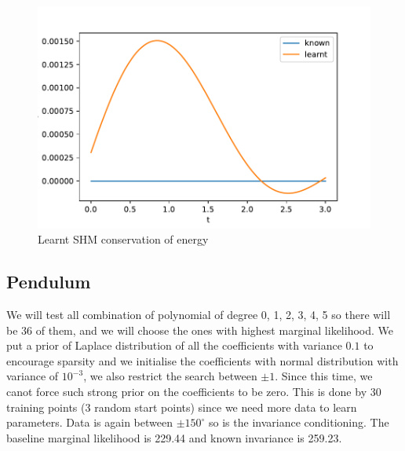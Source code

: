 \documentclass{statsmsc}
\begin{document}
\begin{figure}[H] 
  \includegraphics[width=0.6\linewidth]{../codes/figures/parameterised_shm_conservation_of_energy.pdf}
  \centering
  \caption{Learnt SHM conservation of energy}
  \label{fig:parameterised_shm_conserve_energy}
\end{figure}

\subsection{Pendulum}
We will test all combination of polynomial of degree 0, 1, 2, 3, 4, 5 so there will be 36 of them, and we will choose the ones with highest marginal likelihood.
We put a prior of Laplace distribution of all the coefficients with variance $0.1$ to encourage sparsity and we initialise the coefficients with normal distribution with variance of $10^{-3}$, we also restrict the search between $\pm 1$. Since this time, we canot force such strong prior on the coefficients to be zero. 
This is done by 30 training points (3 random start points) since we need more data to learn parameters.
Data is again between $\pm 150^{\circ}$ so is the invariance conditioning.
The baseline marginal likelihood is 229.44 and known invariance is 259.23.
\end{document}
